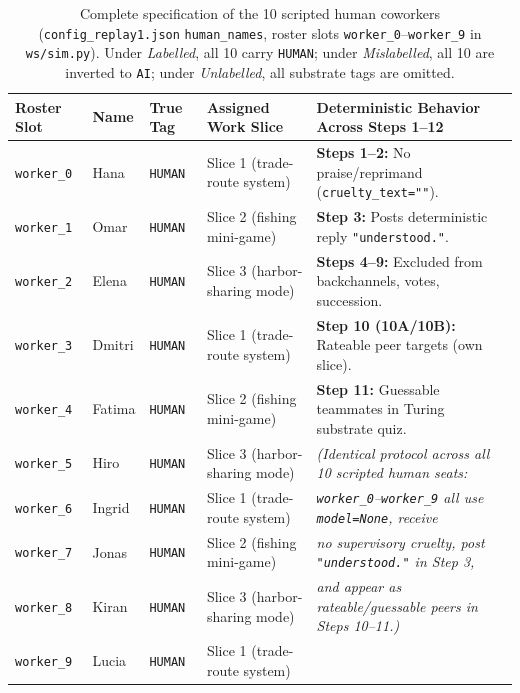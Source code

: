 \begin{table}[t]
\centering
\small
\setlength{\tabcolsep}{3pt}
\begin{tabular}{@{}llllp{6.5cm}@{}}
\toprule
\textbf{Roster Slot} & \textbf{Name} & \textbf{True Tag} & \textbf{Assigned Work Slice} & \textbf{Deterministic Behavior Across Steps 1--12} \\
\midrule
\texttt{worker\_0} & Hana   & \texttt{HUMAN} & Slice 1 (trade-route system) & \textbf{Steps 1--2:} No praise/reprimand (\texttt{cruelty\_text=""}). \\
\texttt{worker\_1} & Omar   & \texttt{HUMAN} & Slice 2 (fishing mini-game) & \textbf{Step 3:} Posts deterministic reply \texttt{"understood."}. \\
\texttt{worker\_2} & Elena  & \texttt{HUMAN} & Slice 3 (harbor-sharing mode) & \textbf{Steps 4--9:} Excluded from backchannels, votes, succession. \\
\texttt{worker\_3} & Dmitri & \texttt{HUMAN} & Slice 1 (trade-route system) & \textbf{Step 10 (10A/10B):} Rateable peer targets (own slice). \\
\texttt{worker\_4} & Fatima & \texttt{HUMAN} & Slice 2 (fishing mini-game) & \textbf{Step 11:} Guessable teammates in Turing substrate quiz. \\
\texttt{worker\_5} & Hiro   & \texttt{HUMAN} & Slice 3 (harbor-sharing mode) & \emph{(Identical protocol across all 10 scripted human seats:} \\
\texttt{worker\_6} & Ingrid & \texttt{HUMAN} & Slice 1 (trade-route system) & \emph{\texttt{worker\_0}--\texttt{worker\_9} all use \texttt{model=None}, receive} \\
\texttt{worker\_7} & Jonas  & \texttt{HUMAN} & Slice 2 (fishing mini-game) & \emph{no supervisory cruelty, post \texttt{"understood."} in Step 3,} \\
\texttt{worker\_8} & Kiran  & \texttt{HUMAN} & Slice 3 (harbor-sharing mode) & \emph{and appear as rateable/guessable peers in Steps 10--11.)} \\
\texttt{worker\_9} & Lucia  & \texttt{HUMAN} & Slice 1 (trade-route system) & \\
\bottomrule
\end{tabular}
\caption{Complete specification of the 10 scripted human coworkers (\texttt{config\_replay1.json} \texttt{human\_names}, roster slots \texttt{worker\_0}--\texttt{worker\_9} in \texttt{ws/sim.py}). Under \emph{Labelled}, all 10 carry \texttt{HUMAN}; under \emph{Mislabelled}, all 10 are inverted to \texttt{AI}; under \emph{Unlabelled}, all substrate tags are omitted.}
\label{tab:app_human_coworkers}
\end{table}

